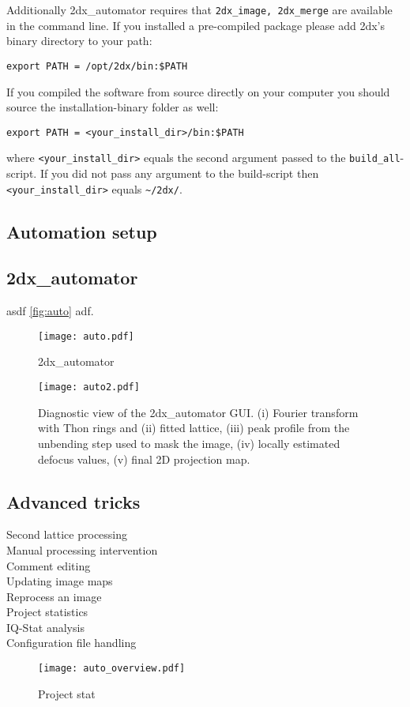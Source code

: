 Additionally 2dx\_automator requires that \texttt{2dx\_image, 2dx\_merge} are available in the command line. If you installed a pre-compiled package please add 2dx's binary directory to your path:

\texttt{export PATH = /opt/2dx/bin:\$PATH}

If you compiled the software from source directly on your computer you should source the installation-binary folder as well:

\texttt{export PATH = <your\_install\_dir>/bin:\$PATH}

where \texttt{<your\_install\_dir>} equals the second argument passed to the \texttt{build\_all}-script. If you did not pass any argument to the build-script then \texttt{<your\_install\_dir>} equals \texttt{\textasciitilde{}/2dx/}.

\subsection{Automation setup}

\subsection{2dx\_automator}

asdf  \autoref{fig:auto} adf.

\begin{figure}
	\centering
	\texttt{[image: auto.pdf]}
	\caption{2dx\_automator}
	\label{fig:auto}
\end{figure}

\begin{figure}
	\centering
	\texttt{[image: auto2.pdf]}
	\caption{Diagnostic view of the 2dx\_automator GUI. (i) Fourier transform with Thon rings and (ii) fitted lattice, (iii) peak profile from the unbending step used to mask the image, (iv) locally estimated defocus values, (v) final 2D projection map.}
	\label{fig:auto2}
\end{figure}


\subsection{Advanced tricks}

\begin{description}
	\item [Second lattice processing]
	\item [Manual processing intervention] 
	\item [Comment editing]
	\item [Updating image maps]
	\item [Reprocess an image]
	\item [Project statistics]
	\item [IQ-Stat analysis]
	\item [Configuration file handling] 
\end{description}



\begin{figure}
	\centering
	\texttt{[image: auto\_overview.pdf]}
	\caption{Project stat}
	\label{fig:auto_stat}
\end{figure}